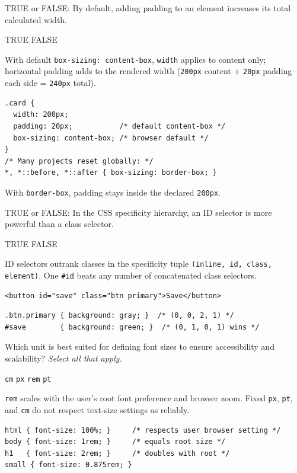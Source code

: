 \question[4]
TRUE or FALSE: By default, adding padding to an element increases its total calculated width.
\begin{choices}
  \CorrectChoice TRUE
  \choice FALSE
\end{choices}
\begin{solution}
  With default \texttt{box-sizing: content-box}, \texttt{width} applies to content only; horizontal padding adds to the rendered width (\texttt{200px} content + \texttt{20px} padding each side = \texttt{240px} total).
\begin{lstlisting}[style=css]
.card {
  width: 200px;
  padding: 20px;           /* default content-box */
  box-sizing: content-box; /* browser default */
}
/* Many projects reset globally: */
*, *::before, *::after { box-sizing: border-box; }
\end{lstlisting}
  With \texttt{border-box}, padding stays inside the declared \texttt{200px}.
\end{solution}

\question[4]
TRUE or FALSE: In the CSS specificity hierarchy, an ID selector is more powerful than a class selector.
\begin{choices}
  \CorrectChoice TRUE
  \choice FALSE
\end{choices}
\begin{solution}
  ID selectors outrank classes in the specificity tuple \texttt{(inline, id, class, element)}. One \texttt{\#id} beats any number of concatenated class selectors.
\begin{lstlisting}[style=htmlinline]
<button id="save" class="btn primary">Save</button>
\end{lstlisting}
\begin{lstlisting}[style=css]
.btn.primary { background: gray; }  /* (0, 0, 2, 1) */
#save        { background: green; }  /* (0, 1, 0, 1) wins */
\end{lstlisting}
\end{solution}

\question[4]
Which unit is best suited for defining font sizes to ensure accessibility and scalability? \emph{Select all that apply.}
\begin{checkboxes}
  \choice \texttt{cm}
  \choice \texttt{px}
  \CorrectChoice \texttt{rem}
  \choice \texttt{pt}
\end{checkboxes}
\begin{solution}
  \texttt{rem} scales with the user's root font preference and browser zoom. Fixed \texttt{px}, \texttt{pt}, and \texttt{cm} do not respect text-size settings as reliably.
\begin{lstlisting}[style=css]
html { font-size: 100%; }     /* respects user browser setting */
body { font-size: 1rem; }     /* equals root size */
h1   { font-size: 2rem; }     /* doubles with root */
small { font-size: 0.875rem; }
\end{lstlisting}
\end{solution}

